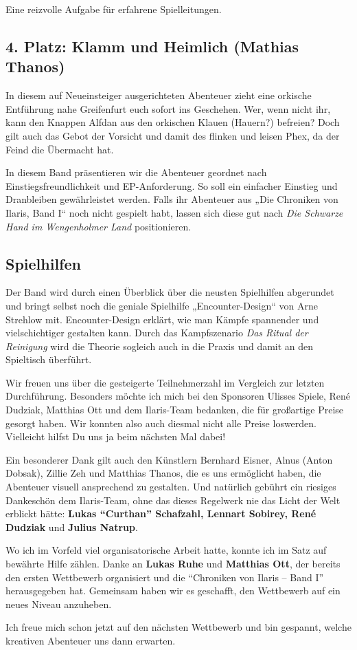 Eine reizvolle Aufgabe für erfahrene Spielleitungen.

\neuespalte

\subsection*{4. Platz: Klamm und Heimlich (Mathias Thanos)}
In diesem auf Neueinsteiger ausgerichteten Abenteuer zieht eine orkische Entführung nahe Greifenfurt euch sofort ins Geschehen. Wer, wenn nicht ihr, kann den Knappen Alfdan aus den orkischen Klauen (Hauern?) befreien? Doch gilt auch das Gebot der Vorsicht und damit des flinken und leisen Phex, da der Feind die Übermacht hat.

\medskip

In diesem Band präsentieren wir die Abenteuer geordnet nach Einstiegsfreundlichkeit und EP-Anforderung. So soll ein einfacher Einstieg und Dranbleiben gewährleistet werden. Falls ihr Abenteuer aus „Die Chroniken von Ilaris, Band I“ noch nicht gespielt habt, lassen sich diese gut nach \textit{Die Schwarze Hand im Wengenholmer Land} positionieren.
\bigskip

\subsection*{Spielhilfen}
Der Band wird durch einen Überblick über die neusten Spielhilfen abgerundet und bringt selbst noch die geniale Spielhilfe „Encounter-Design“ von Arne Strehlow mit. Encounter-Design erklärt, wie man Kämpfe spannender und vielschichtiger gestalten kann. Durch das Kampfszenario \textit{Das Ritual der Reinigung} wird die Theorie sogleich auch in die Praxis und damit an den Spieltisch überführt.%

Wir freuen uns über die gesteigerte Teilnehmerzahl im Vergleich zur letzten Durchführung.
Besonders möchte ich mich bei den Sponsoren Ulisses Spiele, René Dudziak, Matthias Ott und dem Ilaris-Team bedanken, die für großartige Preise gesorgt haben. Wir konnten also auch diesmal nicht alle Preise loswerden.
Vielleicht hilfst Du uns ja beim nächsten Mal dabei!

Ein besonderer Dank gilt auch den Künstlern Bernhard Eisner, Alnus (Anton Dobsak), Zillie Zeh und Matthias Thanos, die es uns ermöglicht haben, die Abenteuer visuell ansprechend zu gestalten.
Und natürlich gebührt ein riesiges Dankeschön dem Ilaris-Team, ohne das dieses Regelwerk nie das Licht der Welt erblickt hätte:
\textbf{Lukas \enquote{Curthan} Schafzahl, Lennart Sobirey, René Dudziak} und \textbf{Julius Natrup}.

Wo ich im Vorfeld viel organisatorische Arbeit hatte, konnte ich im Satz auf bewährte Hilfe zählen. Danke an \textbf{Lukas Ruhe} und \textbf{Matthias Ott}, der bereits den ersten Wettbewerb organisiert und die \enquote{Chroniken von Ilaris -- Band I} herausgegeben hat. Gemeinsam haben wir es geschafft, den Wettbewerb auf ein neues Niveau anzuheben.

Ich freue mich schon jetzt auf den nächsten Wettbewerb und bin gespannt, welche kreativen Abenteuer uns dann erwarten.

\neueseite